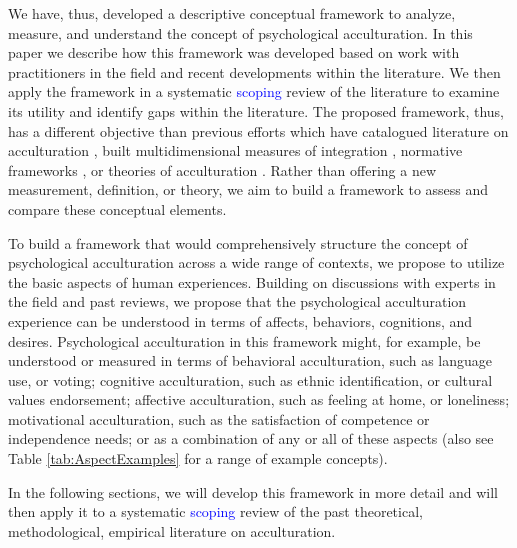 \documentclass[man, 12pt, a4paper, mask]{apa7}
\begin{document}
We have, thus, developed a descriptive conceptual framework to analyze, measure, and understand the concept of psychological acculturation. In this paper we describe how this framework was developed based on work with practitioners in the field and recent developments within the literature. We then apply the framework in a systematic \textcolor{blue}{scoping} review of the literature to examine its utility and identify gaps within the literature. The proposed framework, thus, has a different objective than previous efforts which have catalogued literature on acculturation \citep[e.g.,][]{Castels2003}, built multidimensional measures of integration \citep[e.g.,][]{Harder2018}, normative frameworks \citep[e.g.,][]{Ager2008a}, or theories of acculturation \citep[e.g.,][]{Berry2005}. Rather than offering a new measurement, definition, or theory, we aim to build a framework to assess and compare these conceptual elements. 

To build a framework that would comprehensively structure the concept of psychological acculturation across a wide range of contexts, we propose to utilize the basic aspects of human experiences.
Building on discussions with experts in the field and past reviews, we propose that the psychological acculturation experience can be understood in terms of affects, behaviors, cognitions, and desires. Psychological acculturation in this framework might, for example, be understood or measured in terms of behavioral acculturation, such as language use, or voting; cognitive acculturation, such as ethnic identification, or cultural values endorsement; affective acculturation, such as feeling at home, or loneliness; motivational acculturation, such as the satisfaction of competence or independence needs; or as a combination of any or all of these aspects (also see Table \ref{tab:AspectExamples} for a range of example concepts). 

In the following sections, we will develop this framework in more detail and will then apply it to a systematic \textcolor{blue}{scoping} review of the past theoretical, methodological, empirical literature on acculturation.


\end{document}
